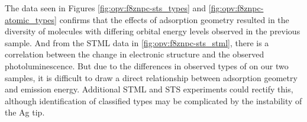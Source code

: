 





The data seen in Figures \ref{fig:opv:f8znpc-sts_types} and \ref{fig:opv:f8znpc-atomic_types} confirms that the effects of adsorption geometry resulted in the diversity of molecules with differing orbital energy levels observed in the previous sample. And from the \ac{STML} data in \autoref{fig:opv:f8znpc-sts_stml}, there is a correlation between the change in electronic structure and the observed photoluminescence. But due to the differences in observed types of  on our two samples, it is difficult to draw a direct relationship between adsorption geometry and emission energy. Additional \ac{STML} and \ac{STS} experiments could rectify this, although identification of classified types may be complicated by the instability of the Ag tip.



